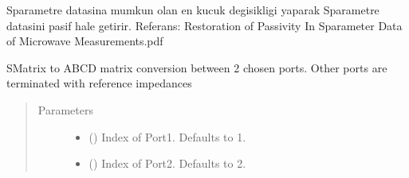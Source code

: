 \documentclass[letterpaper,10pt,english]{sphinxmanual}
\begin{document}
\begin{fulllineitems}
\begin{fulllineitems}
\begin{description}
\end{description}

S\sphinxhyphen{}parametre datasina mumkun olan en kucuk degisikligi yaparak
S\sphinxhyphen{}parametre datasini pasif hale getirir.
Referans:
Restoration of Passivity In S\sphinxhyphen{}parameter Data of Microwave Measurements.pdf

\end{fulllineitems}


\begin{fulllineitems}
\label{\detokenize{touchstone:touchstone.spfile.return_s2p}}
\end{fulllineitems}


\begin{fulllineitems}
\label{\detokenize{touchstone:touchstone.spfile.s2abcd}}
S\sphinxhyphen{}Matrix to ABCD matrix conversion between 2 chosen ports. Other ports are terminated with reference impedances
\begin{quote}\begin{description}
\item[{Parameters}] \leavevmode\begin{itemize}
\item {} 
 (\sphinxstyleliteralemphasis{\sphinxupquote{, }}) \textendash{} Index of Port\sphinxhyphen{}1. Defaults to 1.

\item {} 
 (\sphinxstyleliteralemphasis{\sphinxupquote{, }}) \textendash{} Index of Port\sphinxhyphen{}2. Defaults to 2.

\end{itemize}


\end{description}
\end{quote}
\end{fulllineitems}
\end{fulllineitems}
\end{document}
